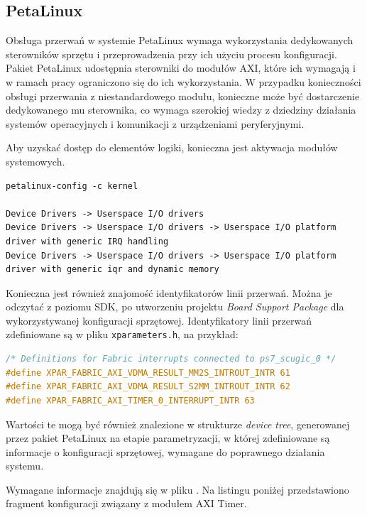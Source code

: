 {\subsection{PetaLinux}

Obsługa przerwań w systemie PetaLinux wymaga wykorzystania dedykowanych sterowników sprzętu i przeprowadzenia przy ich użyciu procesu konfiguracji. Pakiet PetaLinux udostępnia sterowniki do modułów AXI, które ich wymagają i w ramach pracy ograniczono się do ich wykorzystania. W przypadku konieczności obsługi przerwania z niestandardowego modułu, konieczne może być dostarczenie dedykowanego mu sterownika, co wymaga szerokiej wiedzy z dziedziny działania systemów operacyjnych i komunikacji z urządzeniami peryferyjnymi.

Aby uzyskać dostęp do elementów logiki, konieczna jest aktywacja modułów systemowych.

\begin{lstlisting}[breaklines=true, caption=Konfiguracja modułów systemowych.]
petalinux-config -c kernel

Device Drivers -> Userspace I/O drivers
Device Drivers -> Userspace I/O drivers -> Userspace I/O platform driver with generic IRQ handling
Device Drivers -> Userspace I/O drivers -> Userspace I/O platform driver with generic iqr and dynamic memory
\end{lstlisting}

Konieczna jest również znajomość identyfikatorów linii przerwań. Można je odczytać z poziomu SDK, po utworzeniu projektu \emph{Board Support Package} dla wykorzystywanej konfiguracji sprzętowej. Identyfikatory linii przerwań zdefiniowane są w pliku \texttt{xparameters.h}, na przykład:

\begin{lstlisting}[language=C]
/* Definitions for Fabric interrupts connected to ps7_scugic_0 */
#define XPAR_FABRIC_AXI_VDMA_RESULT_MM2S_INTROUT_INTR 61
#define XPAR_FABRIC_AXI_VDMA_RESULT_S2MM_INTROUT_INTR 62
#define XPAR_FABRIC_AXI_TIMER_0_INTERRUPT_INTR 63
\end{lstlisting}

Wartości te mogą być również znalezione w strukturze \textit{device tree}, generowanej przez pakiet PetaLinux na etapie parametryzacji, w której zdefiniowane są informacje o konfiguracji sprzętowej, wymagane do poprawnego działania systemu.

Wymagane informacje znajdują się w pliku . Na listingu poniżej przedstawiono fragment konfiguracji związany z modułem AXI Timer.

}
